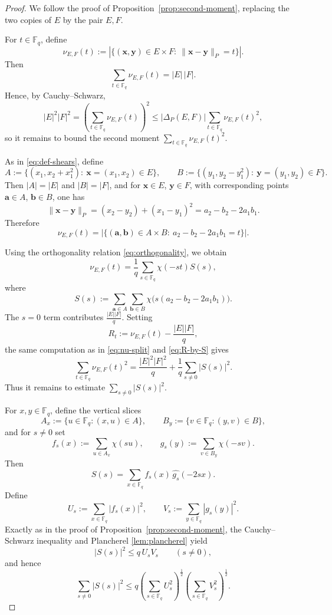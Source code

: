\documentclass{article}
\newcommand{\F}{\mathbb{F}}
\newcommand{\abs}[1]{\left|#1\right|}
\newcommand{\1}{\mathbf{1}}
\begin{document}
\begin{proof}
We follow the proof of Proposition~\ref{prop:second-moment}, replacing the two copies of $E$ by the pair $E,F$.

For $t\in \F_q$, define
\[
\nu_{E,F}(t):=
\abs{\{(\mathbf{x},\mathbf{y})\in E\times F:\ \|\mathbf{x}-\mathbf{y}\|_P=t\}}.
\]
Then
\[
\sum_{t\in\F_q}\nu_{E,F}(t)=|E|\,|F|.
\]
Hence, by Cauchy--Schwarz,
\begin{equation}\label{eq:bipartite-CS}
|E|^2|F|^2
=
\left(\sum_{t\in\F_q}\nu_{E,F}(t)\right)^2
\le
\abs{\Delta_P(E,F)}
\sum_{t\in\F_q}\nu_{E,F}(t)^2,
\end{equation}
so it remains to bound the second moment $\sum\limits_{t\in\F_q}\nu_{E,F}(t)^2$.

As in \eqref{eq:def-shears}, define
\[
A:=\{(x_1,x_2+x_1^2):\ \mathbf{x}=(x_1,x_2)\in E\},
\qquad
B:=\{(y_1,y_2-y_1^2):\ \mathbf{y}=(y_1,y_2)\in F\}.
\]
Then $|A|=|E|$ and $|B|=|F|$, and for $\mathbf{x}\in E$, $\mathbf{y}\in F$, with corresponding points
$\mathbf{a}\in A$, $\mathbf{b}\in B$, one has
\[
\|\mathbf{x}-\mathbf{y}\|_P
=
(x_2-y_2)+(x_1-y_1)^2
=
a_2-b_2-2a_1b_1.
\]
Therefore
\[
\nu_{E,F}(t)
=
\abs{\{(\mathbf{a},\mathbf{b})\in A\times B:\ a_2-b_2-2a_1b_1=t\}}.
\]

Using the orthogonality relation \eqref{eq:orthogonality}, we obtain
\[
\nu_{E,F}(t)
=
\frac{1}{q}\sum_{s\in \F_q}\chi(-st)S(s),
\]
where
\[
S(s):=
\sum_{\mathbf{a}\in A}\sum_{\mathbf{b}\in B}
\chi\bigl(s(a_2-b_2-2a_1b_1)\bigr).
\]
The $s=0$ term contributes $\frac{|E| |F|}{q}$. Setting
\[
R_t:=\nu_{E,F}(t)-\frac{|E| |F|}{q},
\]
the same computation as in \eqref{eq:nu-split} and \eqref{eq:R-by-S} gives
\[
\sum_{t\in\F_q}\nu_{E,F}(t)^2
=
\frac{|E|^2|F|^2}{q}
+
\frac{1}{q}\sum_{s\ne 0}|S(s)|^2.
\]
Thus it remains to estimate $\sum\limits_{s\ne 0}|S(s)|^2$.

For $x,y\in\F_q$, define the vertical slices
\[
A_x:=\{u\in\F_q:(x,u)\in A\},
\qquad
B_y:=\{v\in\F_q:(y,v)\in B\},
\]
and for $s\ne 0$ set
\[
f_s(x):=\sum_{u\in A_x}\chi(su),
\qquad
g_s(y):=\sum_{v\in B_y}\chi(-sv).
\]
Then
\[
S(s)=\sum_{x\in\F_q}f_s(x)\,\widehat{g_s}(-2sx).
\]
Define
\[
U_s:=\sum_{x\in\F_q}|f_s(x)|^2,
\qquad
V_s:=\sum_{y\in\F_q}|g_s(y)|^2.
\]
Exactly as in the proof of Proposition~\ref{prop:second-moment}, the Cauchy--Schwarz inequality and Plancherel \eqref{lem:plancherel} yield
\[
|S(s)|^2\le q\,U_sV_s
\qquad (s\ne 0),
\]
and hence
\begin{equation}\label{eq:bipartite-sumS}
\sum_{s\ne 0}|S(s)|^2
\le
q\left(\sum_{s\in\F_q}U_s^2\right)^{\frac{1}{2}}
\left(\sum_{s\in\F_q}V_s^2\right)^{\frac{1}{2}}.
\end{equation}


\end{proof}
\end{document}
